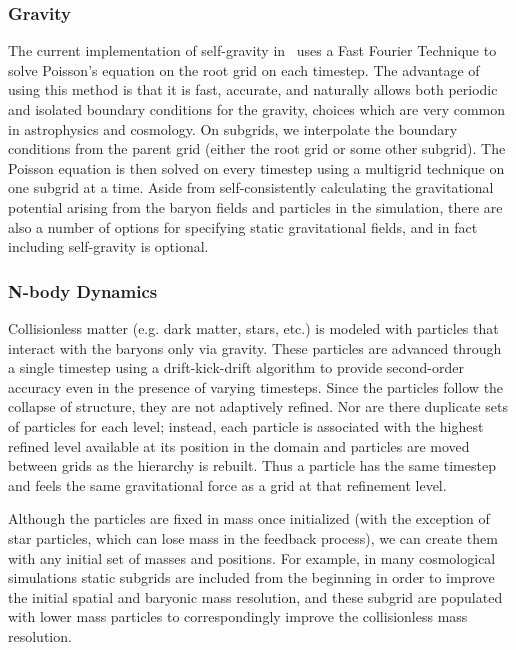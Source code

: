 \subsubsection{Gravity}

The current implementation of self-gravity in \enzo\ uses a Fast
Fourier Technique \citep{Hockney88} to solve Poisson's equation on the
root grid on each timestep.  The advantage of using this method is
that it is fast, accurate, and naturally allows both periodic and
isolated boundary conditions for the gravity, choices which are very
common in astrophysics and cosmology.  On subgrids, we interpolate the
boundary conditions from the parent grid (either the root grid or some
other subgrid). The Poisson equation is then solved on every timestep
using a multigrid technique on one subgrid at a time. Aside from
self-consistently calculating the gravitational potential arising from
the baryon fields and particles in the simulation, there are also a
number of options for specifying static gravitational fields, and in
fact including self-gravity is optional.

\subsubsection{N-body Dynamics}

Collisionless matter (e.g. dark matter, stars, etc.) is modeled with
particles that interact with the baryons only via gravity.  These
particles are advanced through a single timestep using a drift-kick-drift
algorithm \citep{Hockney88} to provide second-order accuracy even in
the presence of varying timesteps.  Since the particles follow the
collapse of structure, they are not adaptively refined.  Nor are there
duplicate sets of particles for each level; instead, each particle is
associated with the highest refined level available at its position in
the domain and particles are moved between grids as the hierarchy is
rebuilt. Thus a particle has the same timestep and feels the same
gravitational force as a grid at that refinement level.

Although the particles are fixed in mass once initialized (with the
exception of star particles, which can lose mass in the feedback
process), we can create them with any initial set of masses and
positions.  For example, in many cosmological simulations static
subgrids are included from the beginning in order to improve the
initial spatial and baryonic mass resolution, and these subgrid are
populated with lower mass particles to correspondingly improve the
collisionless mass resolution.

